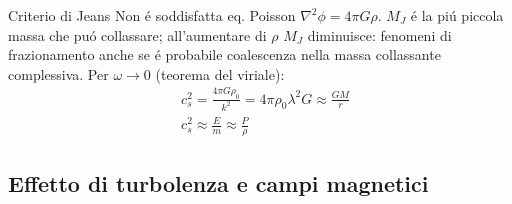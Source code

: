 \begin{wordonframe}{Criterio di Jeans}
Non \'e soddisfatta eq. Poisson $\nabla^2\phi=4\pi G\rho$.
$M_J$ \'e la pi\'u piccola massa che pu\'o collassare; all'aumentare di $\rho$ $M_J$ diminuisce: fenomeni di frazionamento anche se \'e probabile coalescenza nella massa collassante complessiva.
Per $\omega\to 0$ (teorema del viriale):
\begin{align*}
&c_s^2=\frac{4\pi G\rho_0}{k^2}=4\pi\rho_0\lambda^2G\approx\frac{GM}{r}\\
&c_s^2\approx\frac{E}{m}\approx\frac{P}{\rho}
\end{align*}
\end{wordonframe}

\subsection{Effetto di turbolenza e campi magnetici}

